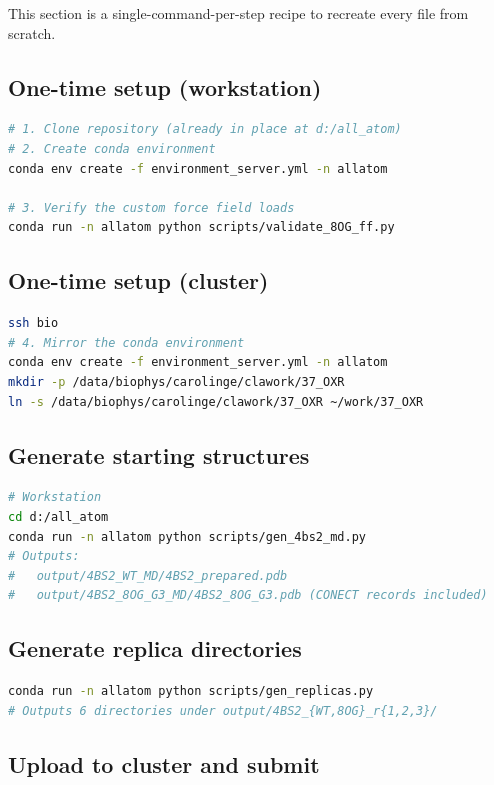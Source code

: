 \documentclass[11pt,a4paper]{article}
\begin{document}
This section is a single-command-per-step recipe to recreate every
file from scratch.

\subsection{One-time setup (workstation)}

\begin{lstlisting}[language=bash]
# 1. Clone repository (already in place at d:/all_atom)
# 2. Create conda environment
conda env create -f environment_server.yml -n allatom

# 3. Verify the custom force field loads
conda run -n allatom python scripts/validate_8OG_ff.py
\end{lstlisting}

\subsection{One-time setup (cluster)}

\begin{lstlisting}[language=bash]
ssh bio
# 4. Mirror the conda environment
conda env create -f environment_server.yml -n allatom
mkdir -p /data/biophys/carolinge/clawork/37_OXR
ln -s /data/biophys/carolinge/clawork/37_OXR ~/work/37_OXR
\end{lstlisting}

\subsection{Generate starting structures}

\begin{lstlisting}[language=bash]
# Workstation
cd d:/all_atom
conda run -n allatom python scripts/gen_4bs2_md.py
# Outputs:
#   output/4BS2_WT_MD/4BS2_prepared.pdb
#   output/4BS2_8OG_G3_MD/4BS2_8OG_G3.pdb (CONECT records included)
\end{lstlisting}

\subsection{Generate replica directories}

\begin{lstlisting}[language=bash]
conda run -n allatom python scripts/gen_replicas.py
# Outputs 6 directories under output/4BS2_{WT,8OG}_r{1,2,3}/
\end{lstlisting}

\subsection{Upload to cluster and submit}
\end{document}
